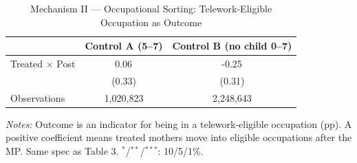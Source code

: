 \begin{table}[htbp]\centering
\caption{Mechanism II --- Occupational Sorting: Telework-Eligible Occupation as Outcome}
\label{tab:mech_allocation}\small
\begin{tabular}{lcc}
\toprule
 & Control A (5--7) & Control B (no child 0--7) \\
\midrule
Treated $\times$ Post & 0.06$^{}$ & -0.25$^{}$ \\
 & (0.33) & (0.31) \\
Observations & 1,020,823 & 2,248,643 \\
\bottomrule\end{tabular}
\begin{tablenotes}\small
\item \textit{Notes:} Outcome is an indicator for being in a telework-eligible occupation (pp). A positive coefficient means treated mothers move into eligible occupations after the MP. Same spec as Table 3. $^{*}$/$^{**}$/$^{***}$: 10/5/1\%.
\end{tablenotes}\end{table}
